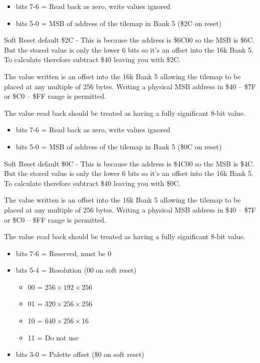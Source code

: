 \begin{itemize}
\item bits 7-6 = Read back as zero, write values ignored
\item bits 5-0 = MSB of address of the tilemap in Bank 5 (\$2C on
  reset)
\end{itemize}
Soft Reset default \$2C - This is because the address is \$6C00 so the
MSB is \$6C. But the stored value is only the lower 6 bits so it's an
offset into the 16k Bank 5. To calculate therefore subtract \$40
leaving you with \$2C.

The value written is an offset into the 16k Bank 5 allowing the
tilemap to be placed at any multiple of 256 bytes.  Writing a physical
MSB address in \$40 -- \$7F or \$C0 -- \$FF range is permitted.

The value read back should be treated as having a fully significant
8-bit value.

\begin{itemize}
\item bits 7-6 = Read back as zero, write values ignored
\item bits 5-0 = MSB of address of the tilemap in Bank 5 (\$0C on
  reset)
\end{itemize}
Soft Reset default \$0C - This is because the address is \$4C00 so the
MSB is \$4C. But the stored value is only the lower 6 bits so it's an
offset into the 16k Bank 5. To calculate therefore subtract \$40
leaving you with \$0C.

The value written is an offset into the 16k Bank 5 allowing the
tilemap to be placed at any multiple of 256 bytes.  Writing a physical
MSB address in \$40 -- \$7F or \$C0 -- \$FF range is permitted.

The value read back should be treated as having a fully significant
8-bit value.

\begin{itemize}
\item bits 7-6 = Reserved, must be 0
\item bits 5-4 = Resolution (00 on soft reset)
  \begin{itemize}
  \item 00 = $256\times192\times256$
  \item 01 = $320\times256\times256$
  \item 10 = $640\times256\times16$
  \item 11 = Do not use
  \end{itemize}
\item bits 3-0 = Palette offset (\$0 on soft reset)
\end{itemize}

